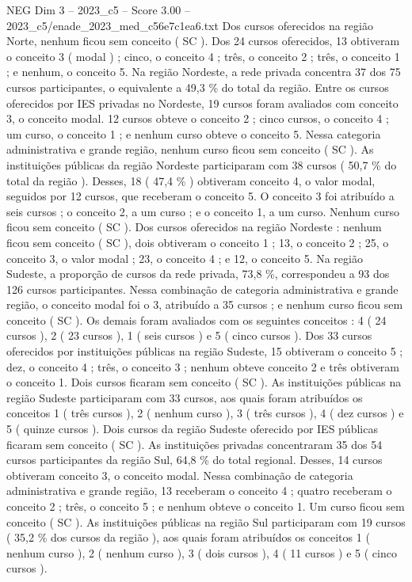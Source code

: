 \begin{textsample}{NEG Dim 3 – 2023\_c5 – Score 3.00 – 2023\_c5/enade\_2023\_med\_c56e7c1ea6.txt}
Dos cursos oferecidos na região Norte, nenhum ficou sem conceito ( SC ).
Dos 24 cursos oferecidos, 13 obtiveram o conceito 3 ( modal ) ; cinco, o conceito 4 ; três, o conceito 2 ; três, o conceito 1 ; e nenhum, o conceito 5.
Na região Nordeste, a rede privada concentra 37 dos 75 cursos participantes, o equivalente a 49,3 \% do total da região.
Entre os cursos oferecidos por IES privadas no Nordeste, 19 cursos foram avaliados com conceito 3, o conceito modal. 12 cursos obteve o conceito 2 ; cinco cursos, o conceito 4 ; um curso, o conceito 1 ; e nenhum curso obteve o conceito 5.
Nessa categoria administrativa e grande região, nenhum curso ficou sem conceito ( SC ).
As instituições públicas da região Nordeste participaram com 38 cursos ( 50,7 \% do total da região ).
Desses, 18 ( 47,4 \% ) obtiveram conceito 4, o valor modal, seguidos por 12 cursos, que receberam o conceito 5.
O conceito 3 foi atribuído a seis cursos ; o conceito 2, a um curso ; e o conceito 1, a um curso.
Nenhum curso ficou sem conceito ( SC ).
Dos cursos oferecidos na região Nordeste : nenhum ficou sem conceito ( SC ), dois obtiveram o conceito 1 ; 13, o conceito 2 ; 25, o conceito 3, o valor modal ; 23, o conceito 4 ; e 12, o conceito 5.
Na região Sudeste, a proporção de cursos da rede privada, 73,8 \%, correspondeu a 93 dos 126 cursos participantes.
Nessa combinação de categoria administrativa e grande região, o conceito modal foi o 3, atribuído a 35 cursos ; e nenhum curso ficou sem conceito ( SC ).
Os demais foram avaliados com os seguintes conceitos : 4 ( 24 cursos ), 2 ( 23 cursos ), 1 ( seis cursos ) e 5 ( cinco cursos ).
Dos 33 cursos oferecidos por instituições públicas na região Sudeste, 15 obtiveram o conceito 5 ; dez, o conceito 4 ; três, o conceito 3 ; nenhum obteve conceito 2 e três obtiveram o conceito 1.
Dois cursos ficaram sem conceito ( SC ).
As instituições públicas na região Sudeste participaram com 33 cursos, aos quais foram atribuídos os conceitos 1 ( três cursos ), 2 ( nenhum curso ), 3 ( três cursos ), 4 ( dez cursos ) e 5 ( quinze cursos ).
Dois cursos da região Sudeste oferecido por IES públicas ficaram sem conceito ( SC ).
As instituições privadas concentraram 35 dos 54 cursos participantes da região Sul, 64,8 \% do total regional.
Desses, 14 cursos obtiveram conceito 3, o conceito modal.
Nessa combinação de categoria administrativa e grande região, 13 receberam o conceito 4 ; quatro receberam o conceito 2 ; três, o conceito 5 ; e nenhum obteve o conceito 1.
Um curso ficou sem conceito ( SC ).
As instituições públicas na região Sul participaram com 19 cursos ( 35,2 \% dos cursos da região ), aos quais foram atribuídos os conceitos 1 ( nenhum curso ), 2 ( nenhum curso ), 3 ( dois cursos ), 4 ( 11 cursos ) e 5 ( cinco cursos ).

\end{textsample}

